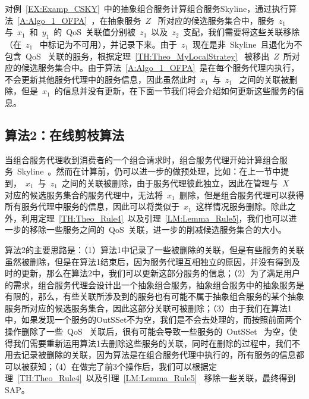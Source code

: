 对例~\ref{EX:Examp_CSKY}~中的抽象组合服务计算组合服务Skyline，通过执行算法~\ref{A:Algo_1_OFPA}~，在抽象服务~$Z$~ 所对应的候选服务集合中，服务~$z_{1}$~ 与~$x_{1}$~和~$y_{1}$~的~QoS~关联值分别被~$z_{3}$~以及~$z_{2}$~支配，我们需要将这些关联移除（在~$z_{1}$~ 中标记为不可用），并记录下来。由于~$z_{1}$~现在是非~Skyline~且退化为不包含~QoS~ 关联的服务，根据定理~\ref{TH:Theo_MyLocalStratey}~ 被移出~$Z$~所对应的候选服务集合中。由于算法~\ref{A:Algo_1_OFPA}~是在每个服务代理内执行，不会更新其他服务代理中的服务信息，因此虽然此时~$x_{1}$~与~$z_{1}$~ 之间的关联被删除，但是~$x_{1}$~的信息并没有更新，在下面一节我们将会介绍如何更新这些服务的信息。

\subsection{算法2：在线剪枝算法}\label{S:SEC_ALGO2}

当组合服务代理收到消费者的一个组合请求时，组合服务代理开始计算组合服务~Skyline~。然而在计算前，仍可以进一步的做预处理，比如：在上一节中提到，~$x_{1}$~与~$z_{1}$~之间的关联被删除，由于服务代理彼此独立，因此在管理与~$X$~ 对应的候选服务集合的服务代理中，无法将~$x_{1}$~删除，但是组合服务代理可以获得所有服务代理中服务的信息，因此可以将类似于~$x_{1}$~这样情况服务删除。除此之外，利用定理~\ref{TH:Theo_Rule4}~以及引理~\ref{LM:Lemma_Rule5}，我们也可以进一步的移除一些服务之间的~QoS~关联，进一步的削减候选服务集合的大小。

算法2的主要思路是：（1）算法1中记录了一些被删除的关联，但是有些服务的关联虽然被删除，但是在算法1结束后，因为服务代理互相独立的原因，并没有得到及时的更新，那么在算法2中，我们可以更新这部分服务的信息；（2）为了满足用户的需求，组合服务代理会设计出一个抽象组合服务，抽象组合服务中的抽象服务是有限的，那么，有些关联所涉及到的服务也有可能不属于抽象组合服务的某个抽象服务所对应的候选服务集合，因此这部分关联可被删除；（3）由于我们在算法1中，如果发现一个服务的OutSSet不为空，我们是不会去处理的，而按照前面两个操作删除了一些~QoS~ 关联后，很有可能会导致一些服务的~OutSSet~ 为空，使得我们需要重新运用算法1去删除这些服务的关联，同时在删除的过程中，我们不用去记录被删除的关联，因为算法是在组合服务代理中执行的，所有服务的信息都可以被获知；（4）在做完了前3个操作后，我们可以根据定理~\ref{TH:Theo_Rule4}~以及引理~\ref{LM:Lemma_Rule5}~ 移除一些关联，最终得到SAP。

